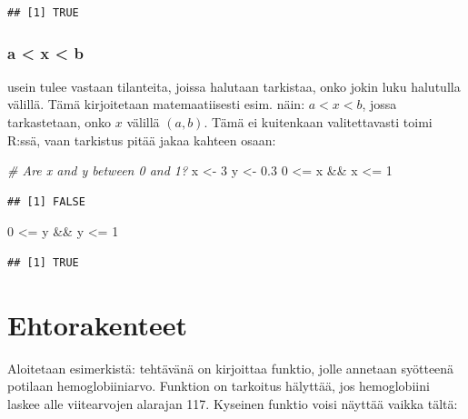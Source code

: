 \documentclass[
]{book}
\newenvironment{Shaded}{\begin{snugshade}}{\end{snugshade}}
\newcommand{\CommentTok}[1]{\textcolor[rgb]{0.56,0.35,0.01}{\textit{#1}}}
\newcommand{\DecValTok}[1]{\textcolor[rgb]{0.00,0.00,0.81}{#1}}
\newcommand{\FloatTok}[1]{\textcolor[rgb]{0.00,0.00,0.81}{#1}}
\newcommand{\NormalTok}[1]{#1}
\newcommand{\OtherTok}[1]{\textcolor[rgb]{0.56,0.35,0.01}{#1}}
\newcommand{\SpecialCharTok}[1]{\textcolor[rgb]{0.00,0.00,0.00}{#1}}
\begin{document}
\begin{verbatim}
## [1] TRUE
\end{verbatim}

\hypertarget{a-x-b}{%
\subsubsection{a \textless{} x \textless{} b}\label{a-x-b}}

usein tulee vastaan tilanteita, joissa halutaan tarkistaa, onko jokin luku halutulla välillä. Tämä kirjoitetaan matemaatiisesti esim. näin: \(a < x < b\), jossa tarkastetaan, onko \(x\) välillä \((a, b)\). Tämä ei kuitenkaan valitettavasti toimi R:ssä, vaan tarkistus pitää jakaa kahteen osaan:

\begin{Shaded}
\begin{Highlighting}[]
\CommentTok{\# Are x and y between 0 and 1?}
\NormalTok{x }\OtherTok{\textless{}{-}} \DecValTok{3}
\NormalTok{y }\OtherTok{\textless{}{-}} \FloatTok{0.3}
\DecValTok{0} \SpecialCharTok{\textless{}=}\NormalTok{ x }\SpecialCharTok{\&\&}\NormalTok{ x }\SpecialCharTok{\textless{}=} \DecValTok{1}
\end{Highlighting}
\end{Shaded}

\begin{verbatim}
## [1] FALSE
\end{verbatim}

\begin{Shaded}
\begin{Highlighting}[]
\DecValTok{0} \SpecialCharTok{\textless{}=}\NormalTok{ y }\SpecialCharTok{\&\&}\NormalTok{ y }\SpecialCharTok{\textless{}=} \DecValTok{1}
\end{Highlighting}
\end{Shaded}

\begin{verbatim}
## [1] TRUE
\end{verbatim}

\hypertarget{ehtorakenteet}{%
\section{Ehtorakenteet}\label{ehtorakenteet}}

Aloitetaan esimerkistä: tehtävänä on kirjoittaa funktio, jolle annetaan syötteenä potilaan hemoglobiiniarvo. Funktion on tarkoitus hälyttää, jos hemoglobiini laskee alle viitearvojen alarajan 117. Kyseinen funktio voisi näyttää vaikka tältä:
\end{document}
